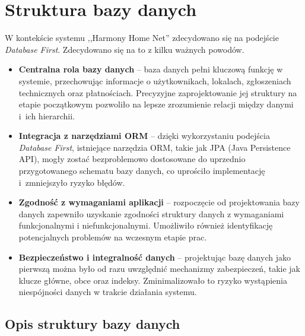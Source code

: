 \section{Struktura bazy danych}
W kontekście systemu ,,Harmony Home Net'' zdecydowano się na podejście \emph{Database First}. Zdecydowano się na to z kilku ważnych powodów.
\begin{itemize}
    \item \textbf{Centralna rola bazy danych} -- baza danych pełni kluczową funkcję w systemie, przechowując informacje o użytkownikach, lokalach, zgłoszeniach technicznych oraz płatnościach. Precyzyjne zaprojektowanie jej struktury na etapie początkowym pozwoliło na lepsze zrozumienie relacji między danymi i~ich hierarchii.
    \item \textbf{Integracja z narzędziami ORM} -- dzięki wykorzystaniu podejścia \emph{Database First}, istniejące narzędzia ORM, takie jak JPA (Java Persistence API), mogły zostać bezproblemowo dostosowane do uprzednio przygotowanego schematu bazy danych, co uprościło implementację i~zmniejszyło ryzyko błędów.
    \item \textbf{Zgodność z wymaganiami aplikacji} -- rozpoczęcie od projektowania bazy danych zapewniło uzyskanie zgodności struktury danych z wymaganiami funkcjonalnymi i niefunkcjonalnymi. Umożliwiło również identyfikację potencjalnych problemów na wczesnym etapie prac.
    \item \textbf{Bezpieczeństwo i integralność danych} -- projektując bazę danych jako pierwszą można było od razu uwzględnić mechanizmy zabezpieczeń, takie jak klucze główne, obce oraz indeksy. Zminimalizowało to ryzyko wystąpienia niespójności danych w trakcie działania systemu.
\end{itemize}

\subsection{Opis struktury bazy danych}

